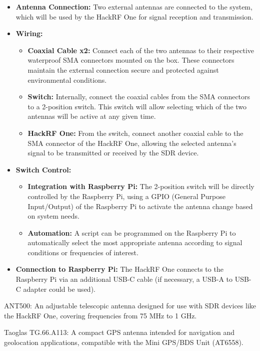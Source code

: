 \begin{list}{*}{}
	\begin{itemize}
		\item \textbf{Antenna Connection:} Two external antennas are connected to the system, which will be used by the HackRF One for signal reception and transmission.
		\item \textbf{Wiring:}
		\begin{itemize}
			\item \textbf{Coaxial Cable x2:} Connect each of the two antennas to their respective waterproof SMA connectors mounted on the box. These connectors maintain the external connection secure and protected against environmental conditions.
			\item \textbf{Switch:} Internally, connect the coaxial cables from the SMA connectors to a 2-position switch. This switch will allow selecting which of the two antennas will be active at any given time.
			\item \textbf{HackRF One:} From the switch, connect another coaxial cable to the SMA connector of the HackRF One, allowing the selected antenna's signal to be transmitted or received by the SDR device.
		\end{itemize}
		\item \textbf{Switch Control:}
		\begin{itemize}
			\item \textbf{Integration with Raspberry Pi:} The 2-position switch will be directly controlled by the Raspberry Pi, using a GPIO (General Purpose Input/Output) of the Raspberry Pi to activate the antenna change based on system needs.
			\item \textbf{Automation:} A script can be programmed on the Raspberry Pi to automatically select the most appropriate antenna according to signal conditions or frequencies of interest.
		\end{itemize}
		\item \textbf{Connection to Raspberry Pi:} The HackRF One connects to the Raspberry Pi via an additional USB-C cable (if necessary, a USB-A to USB-C adapter could be used).
	\end{itemize}
	
	\item {ANT500:} An adjustable telescopic antenna designed for use with SDR devices like the HackRF One, covering frequencies from 75 MHz to 1 GHz.
	
	\item {Taoglas TG.66.A113:} A compact GPS antenna intended for navigation and geolocation applications, compatible with the Mini GPS/BDS Unit (AT6558).
	

\end{list}
